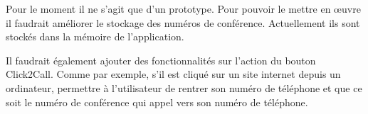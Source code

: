 Pour le moment il ne s'agit que d'un prototype. Pour pouvoir le mettre en œuvre il faudrait améliorer le stockage des numéros de conférence. Actuellement ils sont stockés dans la mémoire de l'application.

Il faudrait également ajouter des fonctionnalités sur l'action du bouton Click2Call. Comme par exemple, s'il est cliqué sur un site internet depuis un ordinateur, permettre à l'utilisateur de rentrer son numéro de téléphone et que ce soit le numéro de conférence qui appel vers son numéro de téléphone.








